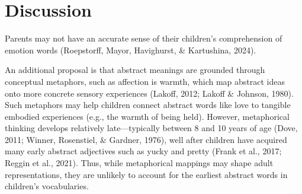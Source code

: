 \documentclass[
  man,floatsintext]{apa6}
\begin{document}
\section{Discussion}\label{discussion}

Parents may not have an accurate sense of their children's comprehension of emotion words (Roepstorff, Mayor, Havighurst, \& Kartushina, 2024).

An additional proposal is that abstract meanings are grounded through conceptual metaphors, such as affection is warmth, which map abstract ideas onto more concrete sensory experiences (Lakoff, 2012; Lakoff \& Johnson, 1980). Such metaphors may help children connect abstract words like love to tangible embodied experiences (e.g., the warmth of being held). However, metaphorical thinking develops relatively late---typically between 8 and 10 years of age (Dove, 2011; Winner, Rosenstiel, \& Gardner, 1976), well after children have acquired many early abstract adjectives such as yucky and pretty (Frank et al., 2017; Reggin et al., 2021). Thus, while metaphorical mappings may shape adult representations, they are unlikely to account for the earliest abstract words in children's vocabularies.
\end{document}

